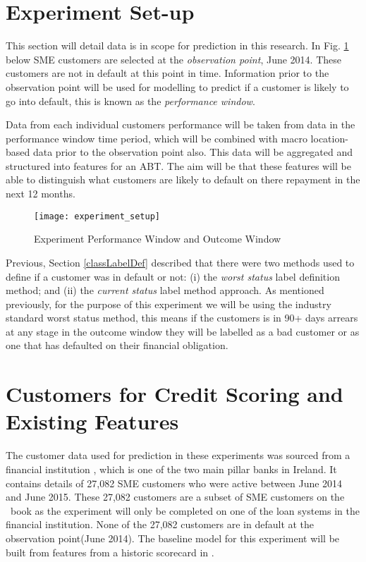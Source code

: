 \section{Experiment Set-up}
This section will detail data is in scope for prediction in this research. In Fig. \ref{fig:experiment_setup1} below SME customers are selected at the \textit{observation point}, June 2014. These customers are not in default at this point in time. Information prior to the observation point will be used for modelling to predict if a customer is likely to go into default, this is known as the \textit{performance window}.

Data from each individual customers performance will be taken from data in the performance window time period, which will be combined with macro location-based data prior to the observation point also. This data will be aggregated and structured into features for an ABT. The aim will be that these features will be able to distinguish what customers are likely to default on there repayment in the next 12 months. 

\begin{figure}[H]
	\texttt{[image: experiment\_setup]}
	\caption[Experiment Performance Window and Outcome Window]
	{Experiment Performance Window and Outcome Window}
	\label{fig:experiment_setup1}
\end{figure}

Previous, Section \ref{classLabelDef} described that there were two methods used to define if a customer was in default or not: (i) the \textit{worst status} label definition method; and (ii) the \textit{current status} label method approach. As mentioned previously, for the purpose of this experiment we will be using the industry standard worst status method, this means if the customers is in 90+ days arrears at any stage in the outcome window they will be labelled as a bad customer or as one that has defaulted on their financial obligation. 


\section{Customers for Credit Scoring and Existing Features}\label{sec:existFeatures}

The customer data used for prediction in these experiments was sourced from a financial institution \subjectname, which is one of the two main pillar banks in Ireland. It contains details of 27,082 SME customers who were active between June 2014 and June 2015. These 27,082 customers are a subset of SME customers on the \subjectname\ book as the experiment will only be completed on one of the loan systems in the financial institution. None of the 27,082 customers are in default at the observation point(June 2014). The baseline model for this experiment will be built from features from a historic scorecard in \subjectname.

